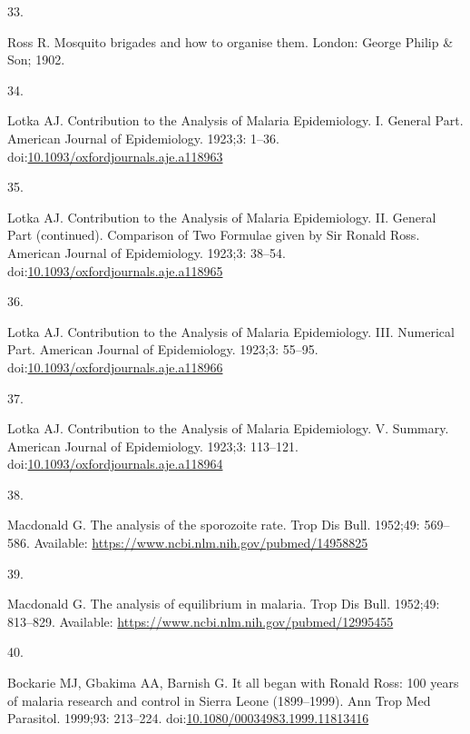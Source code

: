 \documentclass[
]{book}
\newlength{\cslhangindent}
\newlength{\csllabelwidth}
\newenvironment{CSLReferences}[2] %
 {\begin{list}{}{%
  \setlength{\itemindent}{0pt}
  \setlength{\leftmargin}{0pt}
  \setlength{\parsep}{0pt}
  \ifodd #1
   \setlength{\leftmargin}{\cslhangindent}
   \setlength{\itemindent}{-1\cslhangindent}
  \fi
  \setlength{\itemsep}{#2\baselineskip}}}
 {\end{list}}
\newcommand{\CSLLeftMargin}[1]{\parbox[t]{\csllabelwidth}{\strut#1\strut}}
\newcommand{\CSLRightInline}[1]{\parbox[t]{\linewidth - \csllabelwidth}{\strut#1\strut}}
\begin{document}
\begin{CSLReferences}{0}{1}
\CSLLeftMargin{33. }%
\CSLRightInline{Ross R. Mosquito brigades and how to organise them. {London}: {George Philip \& Son}; 1902. }

\CSLLeftMargin{34. }%
\CSLRightInline{Lotka AJ. Contribution to the {Analysis} of {Malaria Epidemiology}. {I}. {General Part}. American Journal of Epidemiology. 1923;3: 1--36. doi:\href{https://doi.org/10.1093/oxfordjournals.aje.a118963}{10.1093/oxfordjournals.aje.a118963}}

\CSLLeftMargin{35. }%
\CSLRightInline{Lotka AJ. Contribution to the {Analysis} of {Malaria Epidemiology}. {II}. {General Part} (continued). {Comparison} of {Two Formulae} given by {Sir Ronald Ross}. American Journal of Epidemiology. 1923;3: 38--54. doi:\href{https://doi.org/10.1093/oxfordjournals.aje.a118965}{10.1093/oxfordjournals.aje.a118965}}

\CSLLeftMargin{36. }%
\CSLRightInline{Lotka AJ. Contribution to the {Analysis} of {Malaria Epidemiology}. {III}. {Numerical Part}. American Journal of Epidemiology. 1923;3: 55--95. doi:\href{https://doi.org/10.1093/oxfordjournals.aje.a118966}{10.1093/oxfordjournals.aje.a118966}}

\CSLLeftMargin{37. }%
\CSLRightInline{Lotka AJ. Contribution to the {Analysis} of {Malaria Epidemiology}. {V}. {Summary}. American Journal of Epidemiology. 1923;3: 113--121. doi:\href{https://doi.org/10.1093/oxfordjournals.aje.a118964}{10.1093/oxfordjournals.aje.a118964}}

\CSLLeftMargin{38. }%
\CSLRightInline{Macdonald G. The analysis of the sporozoite rate. Trop Dis Bull. 1952;49: 569--586. Available: \url{https://www.ncbi.nlm.nih.gov/pubmed/14958825}}

\CSLLeftMargin{39. }%
\CSLRightInline{Macdonald G. The analysis of equilibrium in malaria. Trop Dis Bull. 1952;49: 813--829. Available: \url{https://www.ncbi.nlm.nih.gov/pubmed/12995455}}

\CSLLeftMargin{40. }%
\CSLRightInline{Bockarie MJ, Gbakima AA, Barnish G. It all began with {Ronald Ross}: 100 years of malaria research and control in {Sierra Leone} (1899--1999). Ann Trop Med Parasitol. 1999;93: 213--224. doi:\href{https://doi.org/10.1080/00034983.1999.11813416}{10.1080/00034983.1999.11813416}}


\end{CSLReferences}
\end{document}
